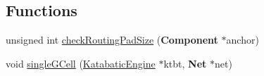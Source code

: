 \subsection*{Functions}
\begin{DoxyCompactItemize}
\item 
unsigned int \hyperlink{group__LoadGlobalRouting_gaad5d32b07d1d53ecc8642e4b10df9605}{check\-Routing\-Pad\-Size} ({\bf Component} $\ast$anchor)
\item 
void \hyperlink{group__LoadGlobalRouting_ga3973291866b39c10cea5ca17f7d174fb}{single\-G\-Cell} (\hyperlink{classKatabatic_1_1KatabaticEngine}{Katabatic\-Engine} $\ast$ktbt, {\bf Net} $\ast$net)
\end{DoxyCompactItemize}
